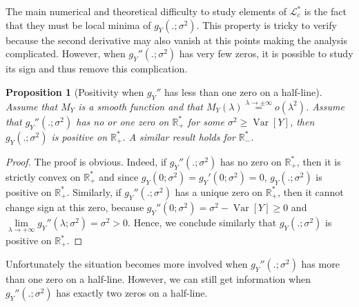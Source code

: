 \documentclass[a4paper, 10pt]{article}
\newtheorem{proposition}{Proposition}[section]
\theoremstyle{definition}
\begin{document}
The main numerical and theoretical difficulty to study elements of $\mathcal{L}_c^*$ is the fact that they must be local minima of $g_Y(.;\sigma^2)$. This property is tricky to verify because the second derivative may also vanish at this points making the analysis complicated. However, when $g_Y''(.;\sigma^2)$ has very few zeros, it is possible to study its sign and thus remove this complication.  

\begin{proposition}[Positivity when $g_Y''$ has less than one zero on a half-line]\label{Prop01Zeros} Assume that $M_Y$ is a smooth function and that $M_Y(\lambda)\overset{\lambda\to \pm\infty}{=}o(\lambda^2)$. Assume that $g_Y''(.;\sigma^2)$ has no or one zero on $\mathbb{R}_+^*$ for some $\sigma^2\geq \operatorname{Var}[Y]$, then $g_Y(.;\sigma^2)$ is positive on $\mathbb{R}_+^*$. A similar result holds for $\mathbb{R}_-^*$.
\end{proposition}

\begin{proof} The proof is obvious. Indeed, if $g_Y''(.;\sigma^2)$ has no zero on $\mathbb{R}_+^*$, then it is strictly convex on $\mathbb{R}_+^*$ and since $g_Y(0;\sigma^2)=g_Y'(0;\sigma^2)=0$, $g_Y(.;\sigma^2)$ is positive on $\mathbb{R}_+^*$. Similarly, if $g_Y''(.;\sigma^2)$ has a unique zero on $\mathbb{R}_+^*$, then it cannot change sign at this zero, because $g_Y''(0;\sigma^2)=\sigma^2-\operatorname{Var}[Y]\geq 0$ and $\underset{\lambda\to +\infty}{\lim}g_Y''(\lambda;\sigma^2)=\sigma^2>0$. Hence, we conclude similarly that $g_Y(.;\sigma^2)$ is positive on $\mathbb{R}_+^*$. 
\end{proof}

Unfortunately the situation becomes more involved when $g_Y''(.;\sigma^2)$ has more than one zero on a half-line. However, we can still get information when $g_Y''(.;\sigma^2)$ has exactly two zeros on a half-line.

\end{document}
